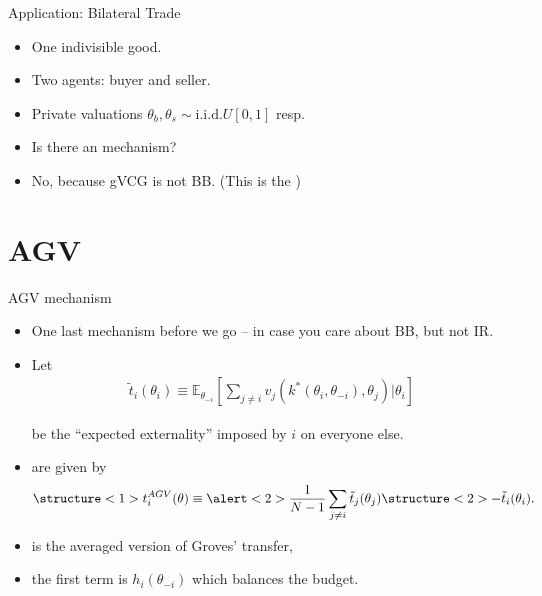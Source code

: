 \documentclass[english,10pt
,aspectratio=169
]{beamer}
\begin{document}
\begin{frame}{Application: Bilateral Trade}
	\begin{example}
		\begin{itemize}
			\item One indivisible good.
			\item Two agents: buyer and seller. 
			\item Private valuations $\theta_b,\theta_s \sim \text{i.i.d.} U[0,1]$ resp.
			\item Is there an 
			 mechanism?
		\end{itemize}
	\end{example}
	\begin{itemize}
		\item No, because gVCG is not BB. 
		(This is the )
	\end{itemize}
\end{frame}




\section{AGV}

\begin{frame}{AGV mechanism}
\begin{itemize}
	\item One last mechanism before we go -- in case you care about BB, but not IR.
	\item Let 
	\vspace{-0.5em}\begin{align*}
		\tilde{t}_i (\theta_i) \equiv \mathbb{E}_{\theta_{-i}} \left[ \sum_{j \neq i} v_j (k^*(\theta_i,\theta_{-i}), \theta_j) | \theta_i \right]
	\end{align*}
	
	be the ``expected externality'' imposed by $i$ on everyone else.
	\item {} are given by
	\vspace{-0.5em}\begin{align*}
		\structure<1>{t_i^{AGV} (\theta) \equiv \alert<2>{\frac{1}{N-1} \sum_{j \neq i} \tilde{t}_j (\theta_j)} \structure<2>{- \tilde{t}_i (\theta_i)}}.
	\end{align*}\vspace{-1em}
	\pause
	\item {} is the averaged version of Groves' transfer,
	\item \alert{the first term} is $h_i(\theta_{-i})$ which balances the budget.
\end{itemize}
\end{frame}
\end{document}
